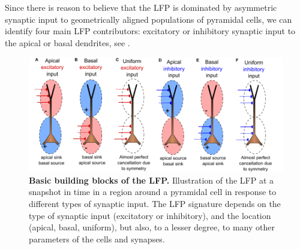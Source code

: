 Since there is reason to believe that the LFP is dominated by asymmetric synaptic input to geometrically aligned populations of pyramidal cells, we can identify four main LFP contributors: excitatory or inhibitory synaptic input to the apical or basal dendrites, see .

\begin{figure}[!ht]
\begin{center}
\includegraphics[width=.7\textwidth]{Figures/LFP/dipole_basics.pdf}
\end{center}
\caption{\textbf{Basic building blocks of the LFP.}
Illustration of the LFP at a snapshot in time in a region around a pyramidal
cell in response to different types of synaptic input. The LFP signature depends on the type of synaptic input (excitatory
or inhibitory), and the location (apical, basal, uniform), but also, to a lesser degree, to many other parameters of the cells
and synapses.
}
\label{fig:LFP:LFP_lego}
\end{figure}




\section{}


